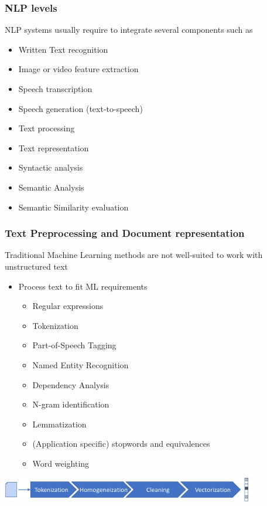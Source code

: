 \documentclass{beamer}
\begin{document}
\begin{frame}

	\frametitle{NLP levels}

    NLP systems usually require to integrate several components such as

	\begin{itemize}
		\item Written Text recognition
		\item Image or video feature extraction
		\item Speech transcription
		\item Speech generation (text-to-speech)
		\item Text processing
		\item Text representation
		\item Syntactic analysis
		\item Semantic Analysis
		\item Semantic Similarity evaluation

	\end{itemize}
	
\end{frame}


\begin{frame}

	\frametitle{Text Preprocessing and Document representation}

    Traditional Machine Learning methods are not well-suited to work with unstructured text
    \begin{itemize}
		\item Process text to fit ML requirements
		\begin{itemize}
		    \item Regular expressions
		    \item Tokenization
		    \item Part-of-Speech Tagging
		    \item Named Entity Recognition
		    \item Dependency Analysis
		    \item N-gram identification
		    \item Lemmatization
		    \item (Application specific) stopwords and equivalences
		    \item Word weighting
		\end{itemize}
	\end{itemize}
	\centerline{\includegraphics[width=11cm]{./figs/NLPTM_doc_preproc.png}}

\end{frame}
\end{document}
